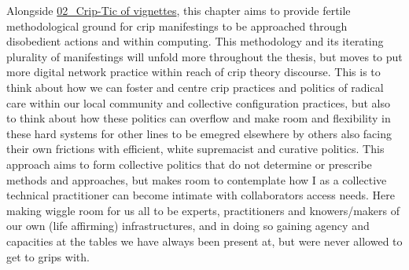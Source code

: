 Alongside
\href{../02_Crip-Tic\%20of\%20vignettes/02_Crip-Tic\%20of\%20vignettes.md}{02\_Crip-Tic
of vignettes}, this chapter aims to provide fertile methodological
ground for crip manifestings to be approached through disobedient
actions and within computing. This methodology and its iterating
plurality of manifestings will unfold more throughout the thesis, but
moves to put more digital network practice within reach of crip theory
discourse. This is to think about how we can foster and centre crip
practices and politics of radical care within our local community and
collective configuration practices, but also to think about how these
politics can overflow and make room and flexibility in these hard
systems for other lines to be emegred elsewhere by others also facing
their own frictions with efficient, white supremacist and curative
politics. This approach aims to form collective politics that do not
determine or prescribe methods and approaches, but makes room to
contemplate how I as a collective technical practitioner can become
intimate with collaborators access needs. Here making wiggle room for us
all to be experts, practitioners and knowers/makers of our own (life
affirming) infrastructures, and in doing so gaining agency and
capacities at the tables we have always been present at, but were never
allowed to get to grips with.
